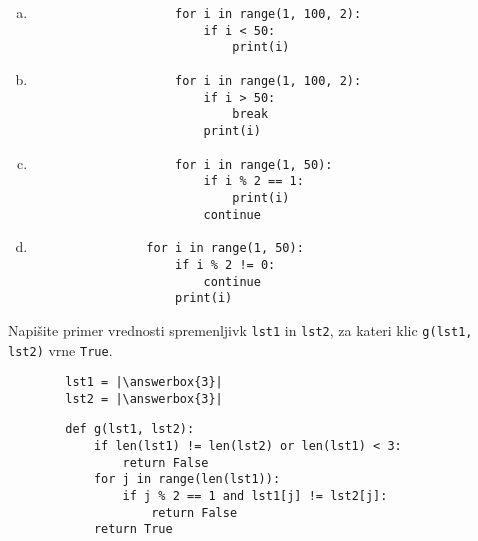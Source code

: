 \documentclass[arhiv, 10pt]{../izpit}
\newcommand{\inlinepy}[1]{\texttt{#1}}
\newcommand{\answerbox}[1]{\framebox{\vphantom{\large M}\hspace{#1cm}}}
\begin{document}
        \begin{multicols}{2}
        \begin{enumerate}[(a)]
\item 
                \begin{verbatim}
                    for i in range(1, 100, 2):
                        if i < 50:
                            print(i)
                \end{verbatim}
            
\item 
                \begin{verbatim}
                    for i in range(1, 100, 2):
                        if i > 50:
                            break
                        print(i)
                \end{verbatim}
            
\item 
                \begin{verbatim}
                    for i in range(1, 50):
                        if i % 2 == 1:
                            print(i)
                        continue
                \end{verbatim}
            
\item 
            \begin{verbatim}
                for i in range(1, 50):
                    if i % 2 != 0:
                        continue
                    print(i)
            \end{verbatim}
        
\end{enumerate}

        \end{multicols}
    
        \naloga*
        \begin{multicols}{2}
        \noindent
        Napišite primer vrednosti spremenljivk \inlinepy{lst1} in \inlinepy{lst2}, za kateri klic \inlinepy{g(lst1, lst2)} vrne \inlinepy{True}.
        \begin{verbatim}
        lst1 = |\answerbox{3}|
        lst2 = |\answerbox{3}|
        \end{verbatim}
        \vfil
        \columnbreak
        \begin{verbatim}
        def g(lst1, lst2):
            if len(lst1) != len(lst2) or len(lst1) < 3:
                return False
            for j in range(len(lst1)):
                if j % 2 == 1 and lst1[j] != lst2[j]:
                    return False
            return True
        \end{verbatim}
        \end{multicols}
    
\end{document}
